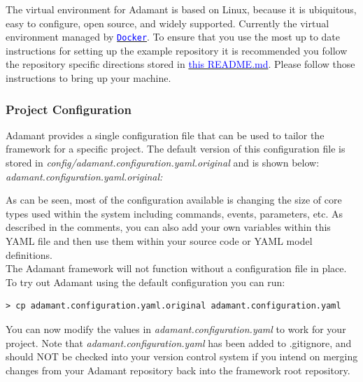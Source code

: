 The virtual environment for Adamant is based on Linux, because it is ubiquitous, easy to configure, open source, and widely supported. Currently the virtual environment managed by \href{https://www.docker.com/}{\texttt{\textcolor{blue}{Docker}}}. To ensure that you use the most up to date instructions for setting up the example repository it is recommended you follow the repository specific directions stored in \href{https://github.com/lasp/adamant_example/blob/main/docker/README.md}{\textcolor{blue}{this README.md}}. Please follow those instructions to bring up your machine. \\

\subsubsection{Project Configuration} \label{Project Configuration}

Adamant provides a single configuration file that can be used to tailor the framework for a specific project. The default version of this configuration file is stored in \textit{config/adamant.configuration.yaml.original} and is shown below: \\

\textit{adamant.configuration.yaml.original:}

As can be seen, most of the configuration available is changing the size of core types used within the system including commands, events, parameters, etc. As described in the comments, you can also add your own variables within this YAML file and then use them within your source code or YAML model definitions. \\

The Adamant framework will not function without a configuration file in place. To try out Adamant using the default configuration you can run:

\vspace{5mm} %
\begin{verbatim}
> cp adamant.configuration.yaml.original adamant.configuration.yaml
\end{verbatim}
\vspace{5mm} %

You can now modify the values in \textit{adamant.configuration.yaml} to work for your project. Note that \textit{adamant.configuration.yaml} has been added to .gitignore, and should NOT be checked into your version control system if you intend on merging changes from your Adamant repository back into the framework root repository.

